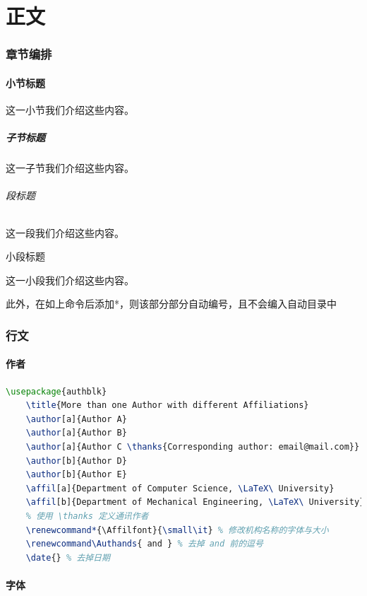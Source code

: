 \part{正文} %
\section{章节编排} %
\subsection{小节标题}这一小节我们介绍这些内容。
\subsubsection{子节标题}这一子节我们介绍这些内容。
\paragraph{段标题}这一段我们介绍这些内容。
\subparagraph{小段标题}这一小段我们介绍这些内容。

此外，在如上命令后添加*，则该部分部分自动编号，且不会编入自动目录中

\section{行文}

\subsection{作者}
\begin{lstlisting}[language={TeX}]
    \usepackage{authblk}
    \title{More than one Author with different Affiliations}
    \author[a]{Author A}
    \author[a]{Author B}
    \author[a]{Author C \thanks{Corresponding author: email@mail.com}}
    \author[b]{Author D}
    \author[b]{Author E}
    \affil[a]{Department of Computer Science, \LaTeX\ University}
    \affil[b]{Department of Mechanical Engineering, \LaTeX\ University}
    % 使用 \thanks 定义通讯作者
    \renewcommand*{\Affilfont}{\small\it} % 修改机构名称的字体与大小
    \renewcommand\Authands{ and } % 去掉 and 前的逗号
    \date{} % 去掉日期
\end{lstlisting}


\subsection{字体}

